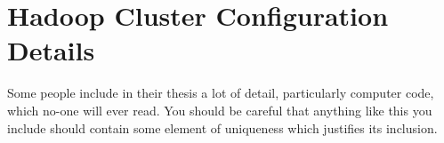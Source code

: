 \documentclass[12pt,a4paper]{report}
\begin{document}
\chapter{Hadoop Cluster Configuration Details}

Some  people include in their \cite{fox2009above}thesis a lot of detail, particularly
computer code, which no-one will ever read. You should be careful that
anything like this you include \cite{website:aws} should contain some element
 of \cite{weinman2011future}uniqueness which justifies its inclusion.





\end{document}
